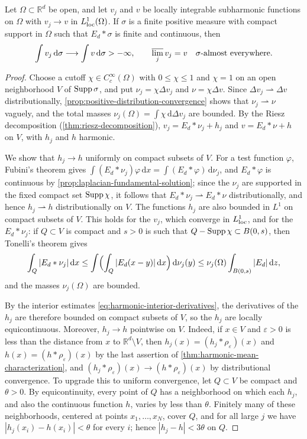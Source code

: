 \begin{lemma}\label{lem:continuous-potential-testing}
Let $\Omega\subset\mathbb R^d$ be open, and let $v_j$ and $v$ be locally integrable subharmonic functions on $\Omega$ with $v_j\to v$ in $L^1_{\mathrm{loc}}(\Omega)$. If $\sigma$ is a finite positive measure with compact support in $\Omega$ such that $E_d*\sigma$ is finite and continuous, then
\[
 \int v_j\,\mathrm d\sigma\longrightarrow\int v\,\mathrm d\sigma> -\infty,
 \qquad \varlimsup_jv_j=v\quad\sigma\text{-almost everywhere}.
\]
\end{lemma}
\begin{proof}
Choose a cutoff $\chi\in C_c^\infty(\Omega)$ with $0\leq\chi\leq1$ and $\chi=1$ on an open neighborhood $V$ of $\operatorname{Supp}\sigma$, and put $\nu_j=\chi\Delta v_j$ and $\nu=\chi\Delta v$. Since $\Delta v_j\rightharpoonup\Delta v$ distributionally, \cref{prop:positive-distribution-convergence} shows that $\nu_j\rightharpoonup\nu$ vaguely, and the total masses $\nu_j(\Omega)=\int\chi\,\mathrm d\Delta v_j$ are bounded. By the Riesz decomposition (\cref{thm:riesz-decomposition}), $v_j=E_d*\nu_j+h_j$ and $v=E_d*\nu+h$ on $V$, with $h_j$ and $h$ harmonic.

We show that $h_j\to h$ uniformly on compact subsets of $V$. For a test function $\varphi$, Fubini's theorem gives $\int(E_d*\nu_j)\varphi\,\mathrm d x=\int(E_d*\varphi)\,\mathrm d\nu_j$, and $E_d*\varphi$ is continuous by \cref{prop:laplacian-fundamental-solution}; since the $\nu_j$ are supported in the fixed compact set $\operatorname{Supp}\chi$, it follows that $E_d*\nu_j\rightharpoonup E_d*\nu$ distributionally, and hence $h_j\rightharpoonup h$ distributionally on $V$. The functions $h_j$ are also bounded in $L^1$ on compact subsets of $V$. This holds for the $v_j$, which converge in $L^1_{\mathrm{loc}}$, and for the $E_d*\nu_j$: if $Q\subset V$ is compact and $s>0$ is such that $Q-\operatorname{Supp}\chi\subset B(0,s)$, then Tonelli's theorem gives
\[
 \int_Q|E_d*\nu_j|\,\mathrm dx\leq\int\Bigl(\int_Q|E_d(x-y)|\,\mathrm dx\Bigr)\,\mathrm d\nu_j(y)\leq\nu_j(\Omega)\int_{B(0,s)}|E_d|\,\mathrm dz,
\]
and the masses $\nu_j(\Omega)$ are bounded.

By the interior estimates \eqref{eq:harmonic-interior-derivatives}, the derivatives of the $h_j$ are therefore bounded on compact subsets of $V$, so the $h_j$ are locally equicontinuous. Moreover, $h_j\to h$ pointwise on $V$. Indeed, if $x\in V$ and $\varepsilon>0$ is less than the distance from $x$ to $\mathbb R^d\setminus V$, then $h_j(x)=(h_j*\rho_\varepsilon)(x)$ and $h(x)=(h*\rho_\varepsilon)(x)$ by the last assertion of \cref{thm:harmonic-mean-characterization}, and $(h_j*\rho_\varepsilon)(x)\to(h*\rho_\varepsilon)(x)$ by distributional convergence. To upgrade this to uniform convergence, let $Q\subset V$ be compact and $\theta>0$. By equicontinuity, every point of $Q$ has a neighborhood on which each $h_j$, and also the continuous function $h$, varies by less than $\theta$. Finitely many of these neighborhoods, centered at points $x_1,\ldots,x_N$, cover $Q$, and for all large $j$ we have $|h_j(x_i)-h(x_i)|<\theta$ for every $i$; hence $|h_j-h|<3\theta$ on $Q$.


\end{proof}
